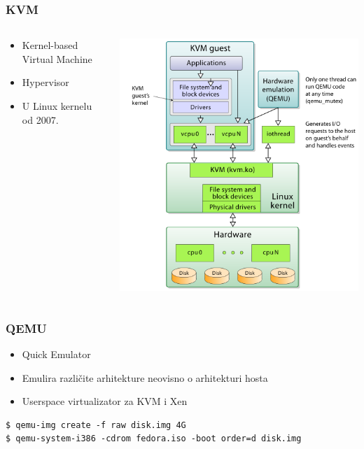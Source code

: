 \documentclass[t]{beamer}
\begin{document}
\begin{frame}
	\frametitle{KVM}
	\begin{columns}[T]
	\begin{column}{0.5\textwidth}
		\begin{itemize}
			\item Kernel-based Virtual Machine
			\item Hypervisor
			\item U Linux kernelu od 2007.
		\end{itemize}
	\end{column}
	\begin{column}{0.5\textwidth}
		\includegraphics[width=\textwidth]{kvm.png}
	\end{column}
	\end{columns}
\end{frame}


\begin{frame}[fragile]
	\frametitle{QEMU}
	\begin{itemize}
		\item Quick Emulator
	\end{itemize}
	\begin{itemize}
		\item Emulira različite arhitekture neovisno o arhitekturi hosta
		\item Userspace virtualizator za KVM i Xen
	\end{itemize}
	\vfill
	\begin{verbatim}
$ qemu-img create -f raw disk.img 4G
$ qemu-system-i386 -cdrom fedora.iso -boot order=d disk.img
	\end{verbatim}
\end{frame}
\end{document}
